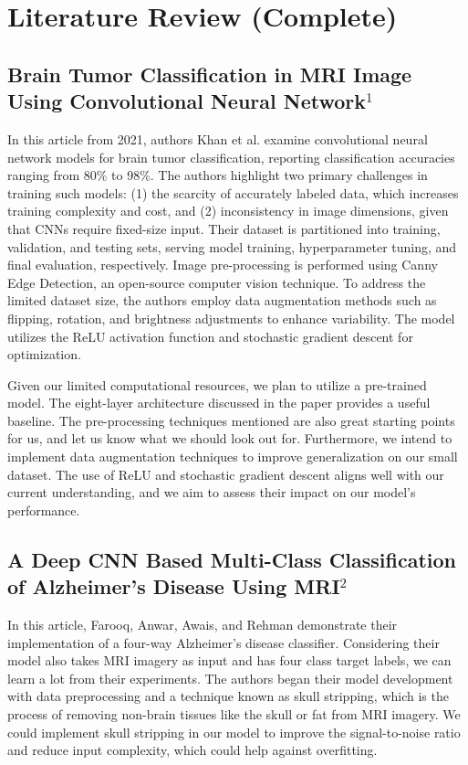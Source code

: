 \documentclass[conference]{IEEEtran}
\begin{document}
\section{\large Literature Review (Complete)}

\subsection{\large Brain Tumor Classification in MRI Image Using Convolutional Neural Network$^{1}$}

In this article from 2021, authors Khan et al. examine convolutional neural network models for brain tumor classification, reporting classification accuracies ranging from 80\% to 98\%. The authors highlight two primary challenges in training such models: (1) the scarcity of accurately labeled data, which increases training complexity and cost, and (2) inconsistency in image dimensions, given that CNNs require fixed-size input. Their dataset is partitioned into training, validation, and testing sets, serving model training, hyperparameter tuning, and final evaluation, respectively. Image pre-processing is performed using Canny Edge Detection, an open-source computer vision technique. To address the limited dataset size, the authors employ data augmentation methods such as flipping, rotation, and brightness adjustments to enhance variability. The model utilizes the ReLU activation function and stochastic gradient descent for optimization.

Given our limited computational resources, we plan to utilize a pre-trained model. The eight-layer architecture discussed in the paper provides a useful baseline. The pre-processing techniques mentioned are also great starting points for us, and let us know what we should look out for. Furthermore, we intend to implement data augmentation techniques to improve generalization on our small dataset. The use of ReLU and stochastic gradient descent aligns well with our current understanding, and we aim to assess their impact on our model's performance.

\subsection{\large A Deep CNN Based Multi-Class Classification of Alzheimer's Disease Using MRI$^{2}$}

In this article, Farooq, Anwar, Awais, and Rehman demonstrate their implementation of a four-way Alzheimer's disease classifier. Considering their model also takes MRI imagery as input and has four class target labels, we can learn a lot from their experiments. The authors began their model development with data preprocessing and a technique known as skull stripping, which is the process of removing non-brain tissues like the skull or fat from MRI imagery. We could implement skull stripping in our model to improve the signal-to-noise ratio and reduce input complexity, which could help against overfitting. 
\end{document}
